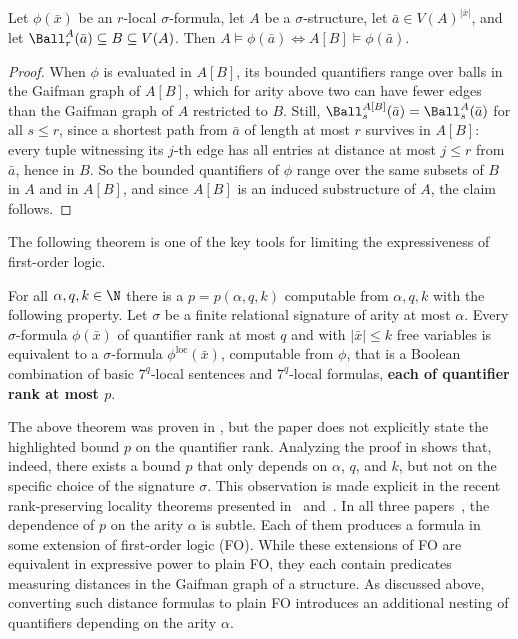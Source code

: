 \begin{lemma}\label{lem:local-substructure}
Let $\phi(\bar x)$ be an $r$-local $\sigma$-formula, let $A$ be a $\sigma$-structure, let $\bar a \in V(A)^{|\bar x|}$, and let $\Ball_r^A(\bar a)\subseteq B\subseteq V(A)$.
Then $A \models \phi(\bar a) \Leftrightarrow A[B] \models \phi(\bar a)$.
\end{lemma}
\begin{proof}
When $\phi$ is evaluated in $A[B]$, its bounded quantifiers range over balls in the Gaifman graph of $A[B]$, which for arity above two can have fewer edges than the Gaifman graph of $A$ restricted to $B$.
Still, $\Ball_s^{A[B]}(\bar a)=\Ball_s^A(\bar a)$ for all $s\le r$, since a shortest path from $\bar a$ of length at most $r$ survives in $A[B]$:
every tuple witnessing its $j$-th edge has all entries at distance at most $j\le r$ from $\bar a$, hence in $B$.
So the bounded quantifiers of $\phi$ range over the same subsets of $B$ in $A$ and in $A[B]$, and since $A[B]$ is an induced substructure of $A$, the claim follows.
\end{proof}

The following theorem is one of the key tools for limiting the expressiveness of first-order logic.

\newcommand{\loc}{\mathrm{loc}}
\begin{theorem}
    \label{fact:gaifman}
    For all $\alpha,q,k \in \N$ there is a $p = p(\alpha,q,k)$ computable from $\alpha,q,k$  with the following property.
    Let $\sigma$ be a finite relational signature of arity at most $\alpha$.
    Every $\sigma$-formula $\phi(\bar x)$ of quantifier rank at most $q$ and with $|\bar x| \leq k$ free variables is equivalent to a $\sigma$-formula $\phi^\loc(\bar x)$, computable from $\phi$, that is a Boolean combination of basic $7^q$-local sentences and $7^q$-local formulas, \textbf{\textup{each of quantifier rank at most $\textit{p}$}}.
\end{theorem}

The above theorem was proven in \cite{gaifman}, but the paper does not explicitly state the highlighted bound $p$ on the quantifier rank.
Analyzing the proof in \cite{gaifman} shows that, indeed, there exists a bound $p$ that only depends on $\alpha$, $q$, and $k$, but not on the specific choice of the signature $\sigma$.
This observation is made explicit in the recent rank-preserving locality theorems presented in~\cite{locality-note} and~\cite{vanbergerem2026rank}.
In all three papers~\cite{gaifman,locality-note,vanbergerem2026rank}, the dependence of $p$ on the arity $\alpha$ is subtle.
Each of them produces a formula in some extension of first-order logic (FO).
While these extensions of FO are equivalent in expressive power to plain FO, they each contain predicates measuring distances in the Gaifman graph of a structure.
As discussed above, converting such distance formulas to plain FO introduces an additional nesting of quantifiers depending on the arity $\alpha$.

